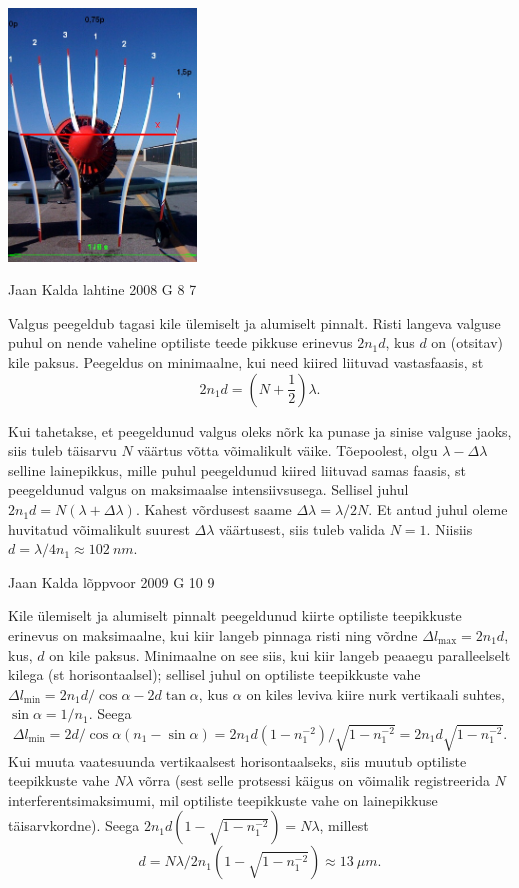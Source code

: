 \documentclass[11pt, twoside]{article}
\begin{document}
{{\begin{center}
	\includegraphics[width=50mm]{2010-v3g-10-Propeller3.jpg}
\end{center}
\fi
}

{Jaan Kalda} %
{lahtine} %
{2008} %
{G 8} %
{7} %
{

\ifSolution
Valgus peegeldub tagasi kile ülemiselt ja alumiselt pinnalt. Risti langeva valguse puhul on nende vaheline optiliste teede pikkuse erinevus $2n_1d$, kus $d$ on (otsitav) kile paksus. Peegeldus on minimaalne, kui need kiired liituvad vastasfaasis, st
\[
2n_1d = \left( N + \frac 12 \right)\lambda.
\]

Kui tahetakse, et peegeldunud valgus oleks nõrk ka punase ja sinise valguse jaoks, siis tuleb täisarvu $N$ väärtus võtta võimalikult väike. Tõepoolest, olgu $\lambda - \Delta \lambda $ selline lainepikkus, mille puhul peegeldunud kiired liituvad samas faasis, st peegeldunud valgus on maksimaalse intensiivsusega. Sellisel juhul $2n_1d = N(\lambda + \Delta \lambda )$. Kahest võrdusest saame $\Delta \lambda = \lambda /2N$. Et antud juhul oleme huvitatud võimalikult suurest $\Delta \lambda$ väärtusest, siis tuleb valida $N = 1$. Niisiis $d = \lambda /4n_1 \approx \SI{102}{nm}$.
\fi
}

{Jaan Kalda} %
{lõppvoor} %
{2009} %
{G 10} %
{9} %
{

\ifSolution
Kile ülemiselt ja alumiselt pinnalt peegeldunud kiirte optiliste teepikkuste erinevus on maksimaalne, kui
kiir langeb pinnaga risti ning võrdne $\Delta l_{\max}=2n_1d$, kus, $d$ on kile paksus. Minimaalne on see siis, kui kiir langeb peaaegu paralleelselt kilega (st horisontaalsel); sellisel juhul on optiliste teepikkuste vahe $\Delta l_{\min}=2n_1d/\cos\alpha-2d\tan\alpha$, kus $\alpha$ on kiles leviva kiire nurk vertikaali suhtes, $\sin\alpha=1/n_1$. Seega 
\[
\Delta l_{\min}=2d/\cos\alpha(n_1-\sin\alpha)=2n_1d(1-n_1^{-2})/\sqrt{1-n_1^{-2}}=2n_1d\sqrt{1-n_1^{-2}}.
\]
Kui muuta vaatesuunda vertikaalsest horisontaalseks, siis muutub optiliste teepikkuste vahe $N\lambda$ võrra (sest selle protsessi käigus on võimalik registreerida $N$ interferentsimaksimumi, mil optiliste teepikkuste vahe on lainepikkuse täisarvkordne). Seega
$2n_1d(1-\sqrt{1-n_1^{-2}})=N\lambda$, millest $$d=N\lambda/2n_1(1-\sqrt{1-n_1^{-2}})\approx \SI{13}{\mu m}.$$
\fi
}

}
\end{document}
